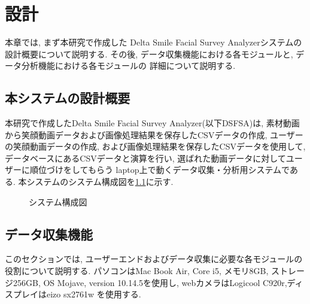 \chapter{設計}
\label{chap:function}

本章では, まず本研究で作成した Delta Smile Facial Survey Analyzerシステムの
設計概要について説明する.
その後, データ収集機能における各モジュールと, データ分析機能における各モジュールの
詳細について説明する.

\section{本システムの設計概要}
本研究で作成したDelta Smile Facial Survey Analyzer(以下DSFSA)は,
素材動画から笑顔動画データおよび画像処理結果を保存したCSVデータの作成,
ユーザーの笑顔動画データの作成, および画像処理結果を保存したCSVデータを使用して,
データベースにあるCSVデータと演算を行い, 選ばれた動画データに対してユーザーに順位づけをしてもらう
laptop上で動くデータ収集・分析用システムである.
本システムのシステム構成図を\ref{fig:system_architecture}に示す.

\begin{figure}[htbp]
    \begin{center}
    \end{center}
    \caption{システム構成図}
    \label{fig:system_architecture}
\end{figure}

\section{データ収集機能}
このセクションでは, ユーザーエンドおよびデータ収集に必要な各モジュールの役割について説明する.
パソコンはMac Book Air, Core i5, メモリ8GB, ストレージ256GB, OS Mojave, version 10.14.5を使用し,
webカメラはLogicool C920r,ディスプレイはeizo sx2761w を使用する.

